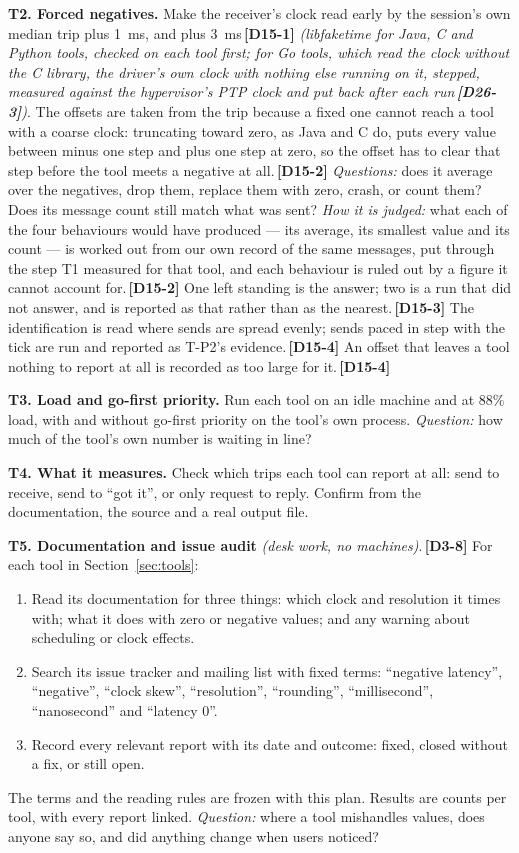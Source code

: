 \documentclass[11pt]{article}
\newcommand{\gl}[1]{{\color{soft}\itshape\small (#1)}}
\newcommand{\chg}[1]{\,{\color{chgcol}\bfseries\footnotesize[#1]}}
\newcommand{\chgold}[1]{\,{\color{oldcol}\bfseries\footnotesize[#1]}}
\begin{document}
\textbf{T2. Forced negatives.} Make the receiver's clock read early by the session's own median trip plus 1~ms, and plus 3~ms\chgold{D15-1} \gl{libfaketime for Java, C and Python tools, checked on each tool first; for Go tools, which read the clock without the C library, the driver's own clock with nothing else running on it, stepped, measured against the hypervisor's PTP clock and put back after each run\chg{D26-3}}. The offsets are taken from the trip because a fixed one cannot reach a tool with a coarse clock: truncating toward zero, as Java and C do, puts every value between minus one step and plus one step at zero, so the offset has to clear that step before the tool meets a negative at all.\chgold{D15-2} \emph{Questions:} does it average over the negatives, drop them, replace them with zero, crash, or count them? Does its message count still match what was sent? \emph{How it is judged:} what each of the four behaviours would have produced --- its average, its smallest value and its count --- is worked out from our own record of the same messages, put through the step T1 measured for that tool, and each behaviour is ruled out by a figure it cannot account for.\chgold{D15-2} One left standing is the answer; two is a run that did not answer, and is reported as that rather than as the nearest.\chgold{D15-3} The identification is read where sends are spread evenly; sends paced in step with the tick are run and reported as T-P2's evidence.\chgold{D15-4} An offset that leaves a tool nothing to report at all is recorded as too large for it.\chgold{D15-4}

\textbf{T3. Load and go-first priority.} Run each tool on an idle machine and at 88\% load, with and without go-first priority on the tool's own process. \emph{Question:} how much of the tool's own number is waiting in line?

\textbf{T4. What it measures.} Check which trips each tool can report at all: send to receive, send to ``got it'', or only request to reply. Confirm from the documentation, the source and a real output file.

\textbf{T5. Documentation and issue audit} \gl{desk work, no machines}.\chgold{D3-8} For each tool in Section~\ref{sec:tools}:
\begin{enumerate}
  \item Read its documentation for three things: which clock and resolution it times with; what it does with zero or negative values; and any warning about scheduling or clock effects.
  \item Search its issue tracker and mailing list with fixed terms: ``negative latency'', ``negative'', ``clock skew'', ``resolution'', ``rounding'', ``millisecond'', ``nanosecond'' and ``latency 0''.
  \item Record every relevant report with its date and outcome: fixed, closed without a fix, or still open.
\end{enumerate}
The terms and the reading rules are frozen with this plan. Results are counts per tool, with every report linked. \emph{Question:} where a tool mishandles values, does anyone say so, and did anything change when users noticed?
\end{document}

